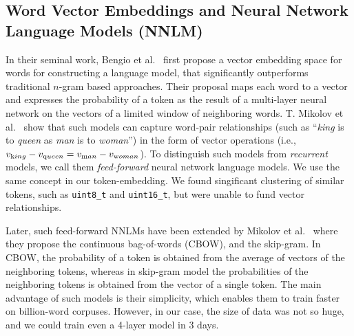 \subsection{Word Vector Embeddings and Neural Network Language Models (NNLM)}
In their seminal work, Bengio et al.~\cite{ref:embedding} first propose a
vector embedding space for words for constructing a language model,
that significantly outperforms traditional $n$-gram based
approaches. Their proposal maps each word to a vector and expresses the
probability of a token as the result of a multi-layer neural network on the
vectors of a limited window of neighboring words. T. Mikolov
et al.~ \cite{ref:regularities} show that such models can capture word-pair relationships
(such as ``{\em king} is to {\em queen} as {\em man} is to {\em woman}'') in
the form of vector operations (i.e., $v_{\text king} -
v_{\text queen} = v_{\text man} - v_{\text woman}$). To distinguish such models
from {\it recurrent} models, we
call them {\it feed-forward} neural network language models.
We use the same concept in our token-embedding. We found singificant clustering
of similar tokens, such as {\tt uint8\_t} and {\tt uint16\_t}, but were unable
to fund vector relationships.

Later, such feed-forward NNLMs have been extended by Mikolov et
al.~\cite{ref:mikolov:wvec} where they propose the continuous
bag-of-words (CBOW), and the skip-gram. In CBOW, the probability of a token is
obtained from the average of vectors of the neighboring tokens, whereas in
skip-gram model the probabilities of the neighboring tokens is obtained from the
vector of a single token. The main advantage of such models is their
simplicity, which enables them to train
faster on billion-word corpuses. However, in our case, the size of data was not
so huge, and we could train even a 4-layer model in 3 days.

